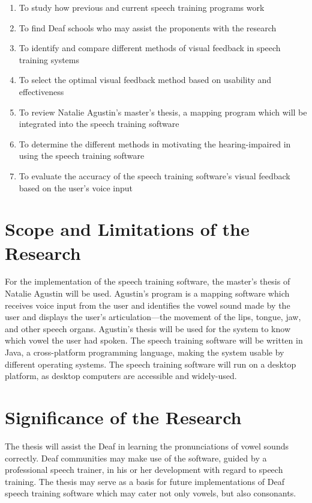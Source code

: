 \begin{enumerate}
\item To study how previous and current speech training programs work
\item To find Deaf schools who may assist the proponents with the research
\item To identify and compare different methods of visual feedback in speech training systems
\item To select the optimal visual feedback method based on usability and effectiveness
\item To review Natalie Agustin's \citeyear{agustin:2014:SOM} master's thesis, a mapping program which will be integrated into the speech training software
\item To determine the different methods in motivating the hearing-impaired in using the speech training software
\item To evaluate the accuracy of the speech training software's visual feedback based on the user's voice input
\end{enumerate}

\section{Scope and Limitations of the Research}
\label{sec:scopelimitations}

For the implementation of the speech training software, the master's thesis of Natalie Agustin \citeyear{agustin:2014:SOM} will be used. Agustin's program is a mapping software which receives voice input from the user and identifies the vowel sound made by the user and displays the user’s articulation---the movement of the lips, tongue, jaw, and other speech organs. Agustin's thesis will be used for the system to know which vowel the user had spoken.
The speech training software will be written in Java, a cross-platform programming language, making the system usable by different operating systems.
The speech training software will run on a desktop platform, as desktop computers are accessible and widely-used.

\section{Significance of the Research}
\label{sec:significance}

The thesis will assist the Deaf in learning the pronunciations of vowel sounds correctly. Deaf communities may make use of the software, guided by a professional speech trainer, in his or her development with regard to speech training.
The thesis may serve as a basis for future implementations of Deaf speech training software which may cater not only vowels, but also consonants.